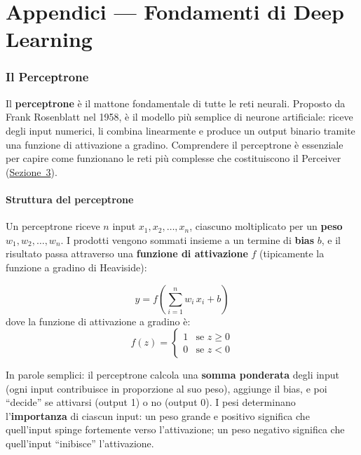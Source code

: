 \documentclass[12pt,a4paper]{article}
\begin{document}
\newpage
\part*{Appendici --- Fondamenti di Deep Learning}
\appendix

\section{Il Perceptrone} \label{app:perceptron}

Il \textbf{perceptrone} \`e il mattone fondamentale di tutte le reti neurali. Proposto da Frank Rosenblatt nel 1958, \`e il modello pi\`u semplice di neurone artificiale: riceve degli input numerici, li combina linearmente e produce un output binario tramite una funzione di attivazione a gradino. Comprendere il perceptrone \`e essenziale per capire come funzionano le reti pi\`u complesse che costituiscono il Perceiver (\hyperref[sec:architettura]{Sezione~3}).

\subsection{Struttura del perceptrone}

Un perceptrone riceve $n$ input $x_1, x_2, \ldots, x_n$, ciascuno moltiplicato per un \textbf{peso} $w_1, w_2, \ldots, w_n$. I prodotti vengono sommati insieme a un termine di \textbf{bias} $b$, e il risultato passa attraverso una \textbf{funzione di attivazione} $f$ (tipicamente la funzione a gradino di Heaviside):

\begin{formulabox}
\[
    y = f\!\left(\sum_{i=1}^{n} w_i \, x_i + b\right)
\]
dove la funzione di attivazione a gradino \`e:
\[
    f(z) = \begin{cases} 1 & \text{se } z \geq 0 \\ 0 & \text{se } z < 0 \end{cases}
\]
\end{formulabox}

In parole semplici: il perceptrone calcola una \textbf{somma ponderata} degli input (ogni input contribuisce in proporzione al suo peso), aggiunge il bias, e poi ``decide'' se attivarsi (output 1) o no (output 0). I pesi determinano l'\textbf{importanza} di ciascun input: un peso grande e positivo significa che quell'input spinge fortemente verso l'attivazione; un peso negativo significa che quell'input ``inibisce'' l'attivazione.
\end{document}
